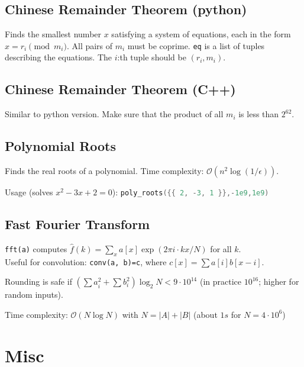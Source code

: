 \documentclass{article}
\begin{document}
\subsection*{Chinese Remainder Theorem (python)}
Finds the smallest number $x$ satisfying a system of equations, each in the form $x = r_i \pmod{m_i}$. All pairs of $m_i$ must be coprime.
\lstinline{eq} is a list of tuples describing the equations. The $i$:th tuple should be $(r_i, m_i)$.


\subsection*{Chinese Remainder Theorem (C++)}
Similar to python version. Make sure that the product of all $m_i$ is less than $2^{62}$.


\subsection*{Polynomial Roots}

Finds the real roots of a polynomial. Time complexity: $\mathcal{O}(n^2 \log(1/\epsilon))$.

Usage (solves $x^2-3x+2 = 0$): \lstinline[language=C++]|poly_roots({{ 2, -3, 1 }},-1e9,1e9)|



\pagebreak

\subsection*{Fast Fourier Transform}
\lstinline{fft(a)} computes $\hat f(k) = \sum_x a[x] \exp(2\pi i \cdot k x / N)$ for all $k$.\\
Useful for convolution: \lstinline{conv(a, b)=c}, where $c[x] = \sum a[i]b[x-i]$.

Rounding is safe if $(\sum a_i^2 + \sum b_i^2)\log_2{N} < 9\cdot10^{14}$
(in practice $10^{16}$; higher for random inputs).

Time complexity: $\mathcal{O}(N \log N)$ with $N = |A|+|B|$ (about $1s$ for $N=4 \cdot 10^6$)


\pagebreak

\section*{Misc}
\end{document}
